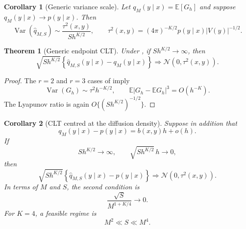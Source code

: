\documentclass[11pt]{article}
\newtheorem{theorem}{Theorem}[section]
\newtheorem{corollary}{Corollary}
\theoremstyle{definition}
\newcommand{\E}{\mathbb{E}}
\newcommand{\Var}{\operatorname{Var}}
\newcommand{\Normal}{\mathcal{N}}
\begin{document}
\begin{corollary}[Generic variance scale]\label{cor:generic_variance}
Let $q_M(y\mid x)=\E[G_h]$ and suppose $q_M(y\mid x)\to p(y\mid x)$. Then
\begin{equation}\label{eq:generic_variance}
\Var(\widehat q_{M,S})
\sim
\frac{\tau^2(x,y)}{S h^{K/2}},
\qquad
\tau^2(x,y)=(4\pi)^{-K/2}p(y\mid x)|V(y)|^{-1/2}.
\end{equation}
\end{corollary}

\begin{theorem}[Generic endpoint CLT]\label{thm:generic_clt}
Under , if $S h^{K/2}\to\infty$, then
\begin{equation}\label{eq:generic_clt}
\sqrt{S h^{K/2}}
\left\{\widehat q_{M,S}(y\mid x)-q_M(y\mid x)\right\}
\Longrightarrow
\Normal(0,\tau^2(x,y)).
\end{equation}
\end{theorem}

\begin{proof}
The $r=2$ and $r=3$ cases of  imply
\[
\Var(G_h)\sim\tau^2h^{-K/2},
\qquad
\E|G_h-\E G_h|^3=O(h^{-K}).
\]
The Lyapunov ratio is again $O\{(S h^{K/2})^{-1/2}\}$.
\end{proof}

\begin{corollary}[CLT centred at the diffusion density]\label{cor:diffusion_clt}
Suppose in addition that
\begin{equation}\label{eq:euler_bias_expansion}
q_M(y\mid x)-p(y\mid x)=b(x,y)h+o(h).
\end{equation}
If
\begin{equation}\label{eq:bias_negligible}
S h^{K/2}\to\infty,
\qquad
\sqrt{S h^{K/2}}\,h\to0,
\end{equation}
then
\begin{equation}\label{eq:diffusion_clt}
\sqrt{S h^{K/2}}
\left\{\widehat q_{M,S}(y\mid x)-p(y\mid x)\right\}
\Longrightarrow
\Normal(0,\tau^2(x,y)).
\end{equation}
In terms of $M$ and $S$, the second condition is
\begin{equation}\label{eq:correct_bias_rate}
\frac{\sqrt S}{M^{1+K/4}}\longrightarrow0.
\end{equation}
For $K=4$, a feasible regime is
\begin{equation}\label{eq:k4_feasible}
M^2\ll S\ll M^4.
\end{equation}
\end{corollary}
\end{document}
